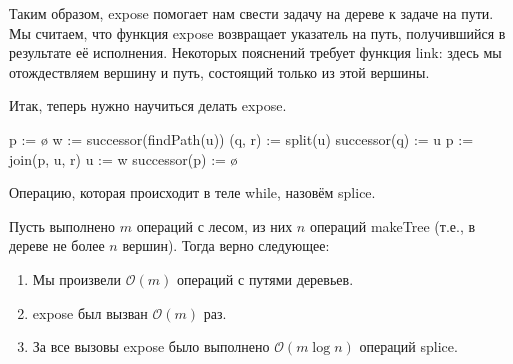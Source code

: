 Таким образом, expose помогает нам свести задачу на дереве к задаче на пути. Мы считаем, что функция expose возвращает указатель на путь, получившийся в результате её исполнения. Некоторых пояснений требует функция link: здесь мы отождествляем вершину и путь, состоящий только из этой вершины.

Итак, теперь нужно научиться делать expose.

\begin{algorithmic}[1]

		\State p := \o {}
		    \State w := successor(findPath(u)) 
		    \State (q, r) := split(u) 
		     
		        \State successor(q) := u 
		    \EndIf
		    \State p := join(p, u, r) 
		    \State u := w 
		\EndWhile
		\State successor(p) := \o
    \EndProcedure
    
\end{algorithmic}

Операцию, которая происходит в теле while, назовём splice.

\begin{theorem}
Пусть выполнено $m$ операций с лесом, из них $n$ операций makeTree (т.е., в дереве не более $n$ вершин). Тогда верно следующее:

\begin{enumerate}
    \item Мы произвели $\mathcal{O}(m)$ операций с путями деревьев.
    \item expose был вызван $\mathcal{O}(m)$ раз.
    \item За все вызовы expose было выполнено $\mathcal{O}(m \log{n})$ операций splice.
\end{enumerate}
\end{theorem}

